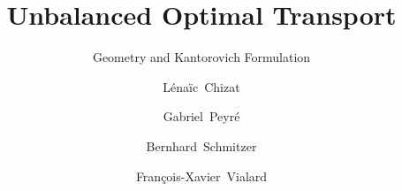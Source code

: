 \documentclass[runningheads,smallextended]{svjour2}  %
\numberwithin{equation}{section}
\begin{document}
\title{Unbalanced Optimal Transport}
\subtitle{Geometry and Kantorovich Formulation}

\author{L\'ena\"ic~Chizat         \and
		Gabriel~Peyr\'e			\and
        Bernhard~Schmitzer 		\and
       Fran\c{c}ois-Xavier~Vialard
}
\date{}



\maketitle




%




%






%
\end{document}
